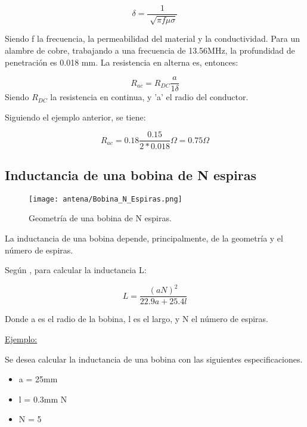 \begin{equation}
\boxed{\delta = \frac{1}{\sqrt[]{\pi f \mu \sigma }}}
\end{equation}

Siendo f la frecuencia, \mu la permeabilidad del material y \sigma la conductividad.
Para un alambre de cobre, trabajando a una frecuencia de 13.56MHz, la profundidad de
penetración es 0.018 mm.
La resistencia en alterna es, entonces:

\begin{equation}
\boxed{R_{ac} = R_{DC} \frac{a}{1\delta}}
\end{equation}
Siendo $R_{DC}$ la resistencia en continua, y 'a' el radio del conductor.

Siguiendo el ejemplo anterior, se tiene:

$$ R_{ac} = 0.18 \frac{0.15}{2*0.018} \Omega = 0.75 \Omega $$

\subsection{Inductancia de una bobina de N espiras}

\begin{figure}[H]
\centering
\texttt{[image: antena/Bobina\_N\_Espiras.png]}
\caption{Geometría de una bobina de N espiras.}
\label{fig:N_esp}
\end{figure}

La inductancia de una bobina depende, principalmente, de la geometría y el número de
espiras.

Según \cite{antena_AN710}, para calcular la inductancia L:

\begin{equation}
\boxed{L = \frac{(aN)^2}{22.9 a+25.4 l}}
\end{equation}

Donde a es el radio de la bobina, l es el largo, y N el número de espiras.\newline

\underline {Ejemplo:}\newline

Se desea calcular la inductancia de una bobina con las siguientes especificaciones.

\begin{itemize}
\item a = 25mm
\item l = 0.3mm N
\item N = 5
\end{itemize}

